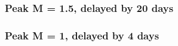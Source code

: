 	\subsubsection{Peak M = 1.5, delayed by 20 days}
		\label{chap:sim_R2_2_5}
	\subsubsection{Peak M = 1, delayed by 4 days}
		\label{chap:sim_R2_3_1}
